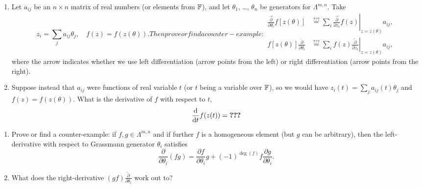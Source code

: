 \begin{exercise}
  \begin{enumerate}
  \item  Let $a_{ij}$ be an $n\times n$ matrix of real numbers (or elements
  from $\mathbb{F}$), and let $\theta_{1}$, \dots, $\theta_{n}$ be generators
  for $\Lambda^{m,n}$. Take
\begin{subequations}
  \begin{equation}
z_{i} = \sum_{j}a_{ij}\theta_{j},\quad f(z)=f(z(\theta)).
  \end{equation}
  Then prove or find a counter-example:
  \begin{align}
    \frac{\overrightarrow{\partial}}{\partial\theta_{i}}f[z(\theta)] &\stackrel{???}{=} \sum_{i}\left.\frac{\overrightarrow{\partial}}{\partial z_{i}}f(z)\right|_{z=z(\theta)}a_{ij},\\
    f[z(\theta)]\frac{\overleftarrow{\partial}}{\partial\theta_{i}} &\stackrel{???}{=} \sum_{i}\left.f(z)\frac{\overleftarrow{\partial}}{\partial z_{i}}\right|_{z=z(\theta)}a_{ij},
  \end{align}
\end{subequations}
where the arrow indicates whether we use left differentiation (arrow
points from the left) or right differentiation (arrow points from the right).
\item Suppose instead that $a_{ij}$ were functions of real variable $t$ (or
  $t$ being a variable over $\mathbb{F}$), so we would have $z_{i}(t) = \sum_{j}a_{ij}(t)\theta_{j}$
  and $f(z) = f(z(\theta))$. What is the derivative of $f$ with respect
  to $t$,
  \begin{equation*}
\frac{\mathrm{d}}{\mathrm{d} t}f(z(t)) = \hbox{\normalfont\bfseries???}
  \end{equation*}
\end{enumerate}
\end{exercise}

\begin{exercise}
  \begin{enumerate}
  \item  Prove or find a counter-example: if $f,g\in\Lambda^{m,n}$ and if
  further $f$ is a homogeneous element (but $g$ can be arbitrary), then
  the left-derivative with respect to Grassmann generator $\theta_{i}$ satisfies
  \begin{equation}
\frac{\partial}{\partial\theta_{i}}(fg) = \frac{\partial f}{\partial\theta_{i}}g+(-1)^{\deg(f)}f\frac{\partial g}{\partial\theta_{i}}.
  \end{equation}
\item What does the right-derivative $(gf)\frac{\overleftarrow{\partial}}{\partial\theta_{i}}$
  work out to?
  \end{enumerate}
\end{exercise}

